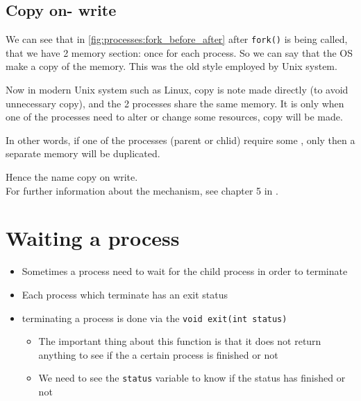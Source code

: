 \documentclass[12pt,a4paper]{book}
\begin{document}
\subsection{Copy on- write}

We can see that in \autoref{fig:processes:fork_before_after} after \verb|fork()| is being called, that we have 2 memory section: once for each process. So we can say that the OS make a copy of the memory. This was the old style employed by Unix system.

Now in modern Unix system such as Linux, copy is note made  directly (to avoid unnecessary copy), and the 2 processes share the same memory. It is only when one of the processes need to alter or change some resources, copy will be made.

In other words, if one of the processes (parent or chlid) require some , only then a separate memory will be duplicated.

Hence the name copy on write.\\

For further information about the mechanism, see chapter 5 in \cite{book_Linux_System_Programming_Robert_Love}.



\newpage
\section{Waiting a process}

\begin{itemize}

\item  Sometimes a process need to wait for the child process in order to terminate

\item  Each process which terminate has an exit status

\item terminating a process is done via the \verb|void exit(int status)|

    \begin{itemize}
        \item The important thing about this function is that it does not return anything to see if the a certain process is finished or not

        \item  We need to see the \verb|status| variable to know if the status has finished or not
    \end{itemize}

\end{itemize}
\end{document}
